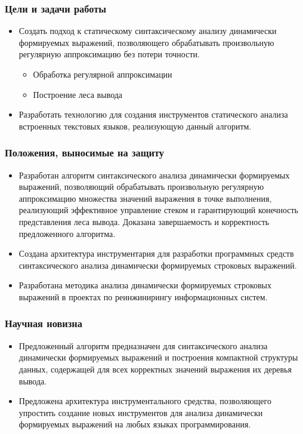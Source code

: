\documentclass{beamer}
\begin{document}
\begin{frame}
    \transwipe[direction=90]
    \frametitle{Цели и задачи работы}
    \begin{itemize}
        \item Создать подход к статическому синтаксическому анализу динамически формируемых выражений, позволяющего обрабатывать произвольную регулярную аппроксимацию без потери точности.
        \begin{itemize}
            \item Обработка регулярной аппроксимации
            \item Построение леса вывода
        \end{itemize}
        \item Разработать технологию для создания инструментов статического анализа встроенных текстовых языков, реализующую данный алгоритм.
    \end{itemize}
\end{frame}

\begin{frame}
    \transwipe[direction=90]
    \frametitle{Положения, выносимые на защиту}
        \begin{itemize}
            \item Разработан алгоритм синтаксического анализа динамически формируемых выражений, позволяющий обрабатывать произвольную регулярную аппроксимацию множества значений выражения в точке выполнения, реализующий эффективное управление стеком и гарантирующий конечность представления леса вывода. Доказана завершаемость и корректность предложенного алгоритма.
            \item Создана архитектура инструментария для разработки программных средств синтаксического анализа динамически формируемых строковых выражений.
            \item Разработана методика анализа динамически формируемых строковых выражений в проектах по реинжинирингу информационных систем.  
        \end{itemize}
\end{frame}

\begin{frame}
    \transwipe[direction=90]
    \frametitle{Научная новизна}
    \begin{itemize}
        \item Предложенный алгоритм предназначен для синтаксического анализа динамически формируемых выражений и построения компактной структуры данных, содержащей для всех корректных значений выражения их деревья вывода.
        \item Предложена архитектура инструментального средства, позволяющего упростить создание новых инструментов для анализа динамически формируемых выражений на любых языках программирования.
    \end{itemize}
\end{frame}
\end{document}
